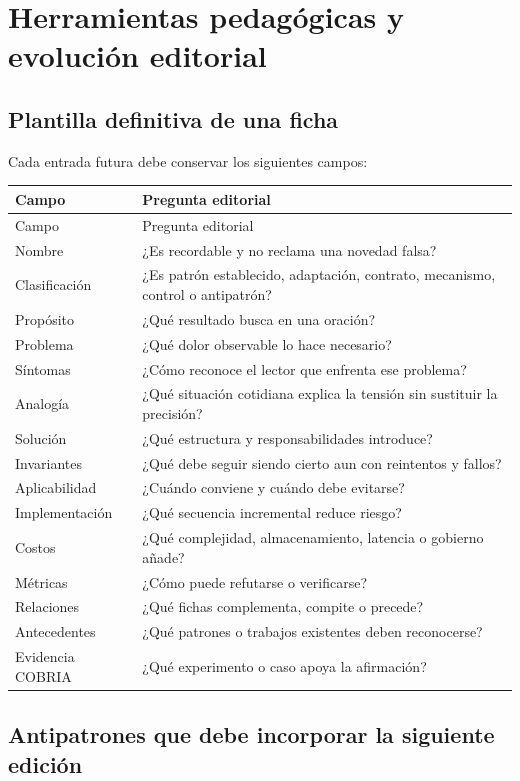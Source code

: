\documentclass[11pt,oneside]{book}
\begin{document}
\part{Herramientas pedagógicas y evolución editorial}
\chapter{Plantilla definitiva de una ficha}

Cada entrada futura debe conservar los siguientes campos:

\begin{longtable}{p{4cm}p{8cm}}\toprule
Campo & Pregunta editorial\\\midrule\endfirsthead
\toprule Campo & Pregunta editorial\\\midrule\endhead
Nombre & ¿Es recordable y no reclama una novedad falsa?\\
Clasificación & ¿Es patrón establecido, adaptación, contrato, mecanismo, control o antipatrón?\\
Propósito & ¿Qué resultado busca en una oración?\\
Problema & ¿Qué dolor observable lo hace necesario?\\
Síntomas & ¿Cómo reconoce el lector que enfrenta ese problema?\\
Analogía & ¿Qué situación cotidiana explica la tensión sin sustituir la precisión?\\
Solución & ¿Qué estructura y responsabilidades introduce?\\
Invariantes & ¿Qué debe seguir siendo cierto aun con reintentos y fallos?\\
Aplicabilidad & ¿Cuándo conviene y cuándo debe evitarse?\\
Implementación & ¿Qué secuencia incremental reduce riesgo?\\
Costos & ¿Qué complejidad, almacenamiento, latencia o gobierno añade?\\
Métricas & ¿Cómo puede refutarse o verificarse?\\
Relaciones & ¿Qué fichas complementa, compite o precede?\\
Antecedentes & ¿Qué patrones o trabajos existentes deben reconocerse?\\
Evidencia COBRIA & ¿Qué experimento o caso apoya la afirmación?\\
\bottomrule\end{longtable}

\chapter{Antipatrones que debe incorporar la siguiente edición}
\end{document}
